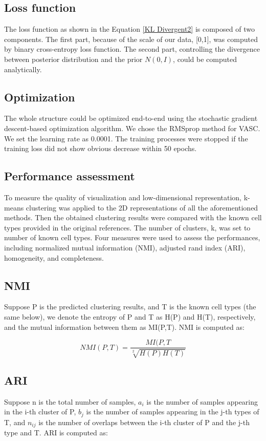 \documentclass[12 pts]{article}
\begin{document}
\subsection{Loss function}
The loss function as shown in the Equation \ref{KL Divergent2} is composed of
two components. The first part, because of the scale of our data, [0,1], was computed by binary cross-entropy loss function. The second part, controlling the divergence between posterior distribution and the prior $N(0,I)$, could be computed analytically.

\subsection{Optimization}
The whole structure could be optimized end-to-end using the stochastic gradient descent-based optimization algorithm. We chose the RMSprop method for VASC. We set the learning rate as 0.0001. The training processes were stopped if the training loss did not show obvious decrease within 50 epochs.

\subsection{Performance assessment}
To measure the quality of visualization and low-dimensional representation, k-means clustering was applied to the 2D representations of all the aforementioned methods. Then the obtained clustering results were compared with the known cell types provided in the original references. The number of clusters, k, was set to number of known cell types. Four measures were used to assess the performances, including normalized mutual information (NMI), adjusted rand index (ARI), homogeneity, and completeness.

\subsection*{NMI}
Suppose P is the predicted clustering results, and T is the known cell types (the same below), we denote the entropy of P and T as H(P) and H(T), respectively, and the mutual information between them as MI(P,T). NMI is computed as:

\begin{equation}
NMI(P,T) = \frac{MI(P,T}{\sqrt[2]{H(P)H(T)}}
\label{NMI}
\end{equation}

\subsection*{ARI}
Suppose n is the total number of samples, $a_i$ is the number of samples appearing in the i-th cluster of P, $b_j$ is the number of samples appearing in the j-th types of T, and $n_{ij}$ is the number of overlaps between the i-th cluster of P and the j-th type and T. ARI is computed as:
\end{document}
